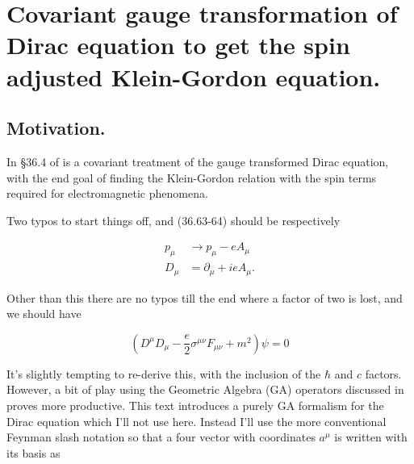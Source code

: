 
%

\chapter{Covariant gauge transformation of Dirac equation to get the spin adjusted Klein-Gordon equation.}
\label{chap:diracCovariant}
{}
\date{Sept 1, 2011}

\newcommand{\pslash}[0]{\cancel{p}}
\newcommand{\aslash}[0]{\cancel{a}}
\newcommand{\bslash}[0]{\cancel{b}}
\newcommand{\Dslash}[0]{\cancel{D}}
\newcommand{\Aslash}[0]{\cancel{A}}
\newcommand{\partialslash}[0]{\cancel{\partial}}

\beginArtWithToc

\section{Motivation.}

In \S 36.4 of \cite{desai2009quantum} is a covariant treatment of the gauge transformed Dirac equation, with the end goal of finding the Klein-Gordon relation with the spin terms required for electromagnetic phenomena.

Two typos to start things off, and (36.63-64) should be respectively

\begin{align}\label{eqn:diracCovariant:10}
p_\mu &\rightarrow p_\mu - e A_\mu \\
D_\mu &= \partial_\mu + i e A_\mu.
\end{align}

Other than this there are no typos till the end where a factor of two is lost, and we should have

\begin{equation}\label{eqn:diracCovariant:30}
\left( D^\mu D_\mu - \frac{e}{2} \sigma^{\mu \nu} F_{\mu \nu} + m^2 \right) \psi = 0
\end{equation}

It's slightly tempting to re-derive this, with the inclusion of the $\hbar$ and $c$ factors.  However, a bit of play using the Geometric Algebra (GA) operators discussed in \cite{doran2003gap} proves more productive.  This text introduces a purely GA formalism for the Dirac equation which I'll not use here.  Instead I'll use the more conventional Feynman slash notation so that a four vector with coordinates $a^\mu$ is written with its basis as

